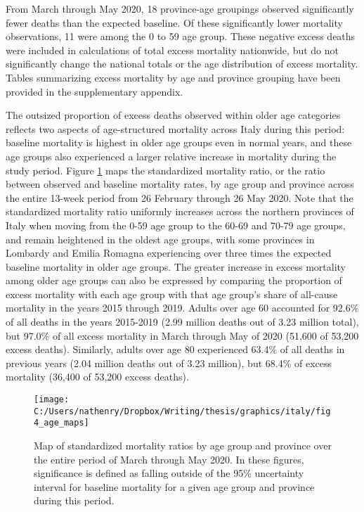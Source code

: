 \documentclass[
]{article}
\begin{document}
From March through May 2020, 18 province-age groupings observed significantly fewer deaths than the expected baseline. Of these significantly lower mortality observations, 11 were among the 0 to 59 age group. These negative excess deaths were included in calculations of total excess mortality nationwide, but do not significantly change the national totals or the age distribution of excess mortality. Tables summarizing excess mortality by age and province grouping have been provided in the supplementary appendix.

The outsized proportion of excess deaths observed within older age categories reflects two aspects of age-structured mortality across Italy during this period: baseline mortality is highest in older age groups even in normal years, and these age groups also experienced a larger relative increase in mortality during the study period. Figure \ref{fig:age-maps} maps the standardized mortality ratio, or the ratio between observed and baseline mortality rates, by age group and province across the entire 13-week period from 26 February through 26 May 2020. Note that the standardized mortality ratio uniformly increases across the northern provinces of Italy when moving from the 0-59 age group to the 60-69 and 70-79 age groups, and remain heightened in the oldest age groups, with some provinces in Lombardy and Emilia Romagna experiencing over three times the expected baseline mortality in older age groups. The greater increase in excess mortality among older age groups can also be expressed by comparing the proportion of excess mortality with each age group with that age group's share of all-cause mortality in the years 2015 through 2019. Adults over age 60 accounted for 92.6\% of all deaths in the years 2015-2019 (2.99 million deaths out of 3.23 million total), but 97.0\% of all excess mortality in March through May of 2020 (51,600 of 53,200 excess deaths). Similarly, adults over age 80 experienced 63.4\% of all deaths in previous years (2.04 million deaths out of 3.23 million), but 68.4\% of excess mortality (36,400 of 53,200 excess deaths).

\begin{figure}[!hbt]

{\centering \texttt{[image: C:/Users/nathenry/Dropbox/Writing/thesis/graphics/italy/fig4\_age\_maps]} 

}

\caption{Map of standardized mortality ratios by age group and province over the entire period of March through May 2020. In these figures, significance is defined as falling outside of the 95\% uncertainty interval for baseline mortality for a given age group and province during this period.}\label{fig:age-maps}
\end{figure}
\end{document}
